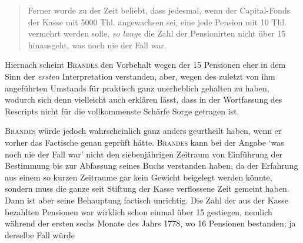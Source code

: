 \begin{quote}
Ferner wurde zu der Zeit beliebt, dass jedesmal, wenn der Capital-Fonds der Kasse mit 5000 Thl. angewachsen sei, eine jede Pension mit 10 Thl. vermehrt werden solle, \textit{so lange} die Zahl der Pensionirten nicht über 15 hinausgeht, was noch nie der Fall war.
\end{quote}
\noindent\hspace*{\parindent}Hiernach scheint \textsc{Brandes} den Vorbehalt wegen der 15 Pensionen eher in dem Sinn der \textit{ersten} Interpretation verstanden, aber, wegen des zuletzt von ihm angeführten Umstands für praktisch ganz unerheblich gehalten zu haben, wodurch sich denn vielleicht auch erklären lässt, dass in der Wortfassung des Rescripts nicht für die vollkommenste Schärfe Sorge getragen ist.

\textsc{Brandes} würde jedoch wahrscheinlich ganz anders geurtheilt haben, wenn er vorher das Factische genau geprüft hätte. \textsc{Brandes} kann bei der Angabe ‘was noch nie der Fall war’ nicht den siebenjährigen Zeitraum von Einführung der Bestimmung bis zur Abfassung seines Buchs verstanden haben, da der Erfahrung aus einem so kurzen Zeitraume gar kein Gewicht beigelegt werden könnte, sondern muss die ganze seit Stiftung der Kasse verflossene Zeit gemeint haben. Dann ist aber seine Behauptung factisch unrichtig. Die Zahl der aus der Kasse bezahlten Pensionen war wirklich schon einmal über 15 gestiegen, nemlich während der ersten sechs Monate des Jahrs 1778, wo 16 Pensionen bestanden; ja derselbe Fall würde
